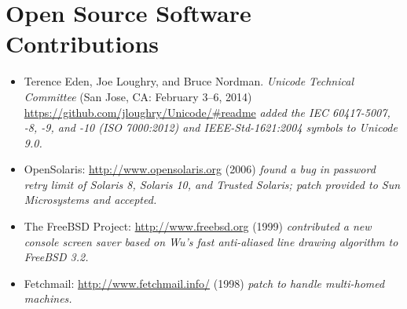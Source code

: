 \section*{Open Source Software Contributions}
\vspace{-2mm}

\begin{itemize}
	\item Terence Eden, Joe Loughry, and Bruce Nordman. \emph{Unicode
		Technical Committee} (San Jose, CA: February 3--6, 2014)
		\url{https://github.com/jloughry/Unicode/#readme} \emph{added
		the IEC 60417-5007, -8, -9, and -10 (ISO 7000:2012) and
		IEEE-Std-1621:2004 symbols to Unicode 9.0.}\vspace{-1mm}
	\item OpenSolaris: \url{http://www.opensolaris.org} (2006)
		\emph{found a bug in password retry limit of Solaris 8, Solaris 10,
		and Trusted Solaris; patch provided to Sun Microsystems and accepted.}\vspace{-1mm}
	\item The FreeBSD Project: \url{http://www.freebsd.org} (1999)
		\emph{contributed a new console screen saver based on Wu's fast
		anti-aliased line drawing algorithm to FreeBSD 3.2.}\vspace{-1mm}
	\item Fetchmail: \url{http://www.fetchmail.info/} (1998)
		\emph{patch to handle multi-homed machines.}
\end{itemize}

